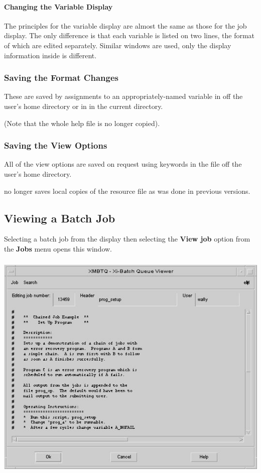 \paragraph{Changing the Variable Display}
The principles for the variable display are almost the same as those for the job display. The only difference is that each variable is listed on
two lines, the format of which are edited separately. Similar windows are used, only the display information inside is different.

\subsubsection{Saving the Format Changes}
These are saved by assignments to an appropriately-named variable in \homeconfigpath{} off the user's home directory or in \configurationfile{}
in the current directory.

(Note that the whole help file is no longer copied).

\subsubsection{Saving the View Options}
All of the view options are saved on request using keywords in the \homeconfigpath{} file off the user's home directory.

\PrXmbtq{} no longer saves local copies of the resource file as was done in previous versions.

\subsection{Viewing a Batch Job}
Selecting a batch job from the display then selecting the \textbf{View job} option from the \textbf{Jobs} menu opens this window.

 \includegraphics[width=13.695cm,height=11.164cm]{img/ref35.jpg}

